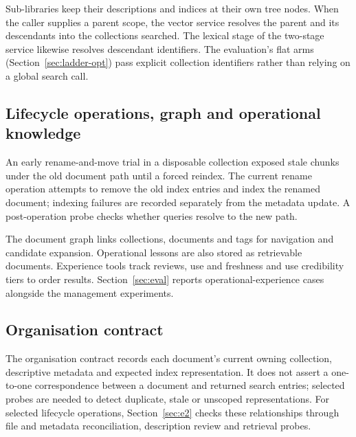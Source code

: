 Sub-libraries keep their descriptions and indices at their own tree nodes.
When the caller supplies a parent scope, the vector service resolves the
parent and its descendants into the collections searched. The lexical stage
of the two-stage service likewise resolves descendant identifiers. The
evaluation's flat arms (Section~\ref{sec:ladder-opt}) pass explicit collection identifiers rather than relying on a global
search call.

\subsection{Lifecycle operations, graph and operational knowledge}
\label{sec:org-lifecycle}
\label{sec:org-graph}
\label{sec:org-experience}

An early rename-and-move trial in a disposable collection exposed stale
chunks under the old document path until a forced reindex. The current rename
operation attempts to remove the old index entries and index the renamed
document; indexing failures are recorded separately from the metadata update.
A post-operation probe checks whether queries resolve to the new path.

The document graph links collections, documents and tags for navigation and
candidate expansion. Operational lessons are also stored as retrievable
documents. Experience tools track reviews, use and freshness and use
credibility tiers to order results. Section~\ref{sec:eval} reports
operational-experience cases alongside the management experiments.

\subsection{Organisation contract}
\label{sec:org-integrity}
\label{sec:org-summary}

The organisation contract records each document's current owning
collection, descriptive metadata and expected index representation. It does
not assert a one-to-one correspondence between a document and returned search
entries; selected probes are needed to detect duplicate, stale or unscoped
representations. For selected lifecycle operations, Section~\ref{sec:e2}
checks these relationships through file and metadata reconciliation,
description review and retrieval probes.
